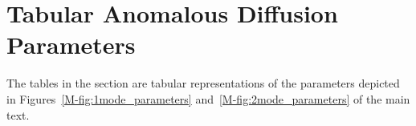 \documentclass{article}
\begin{document}
  


 
  
  \newpage  
  
  \section{Tabular Anomalous Diffusion Parameters}\label{section:tabular_AD_params}

  The tables in the section are tabular representations of the parameters depicted
  in Figures~\ref{M-fig:1mode_parameters} and~\ref{M-fig:2mode_parameters} of the 
  main text.
  
\end{document}
